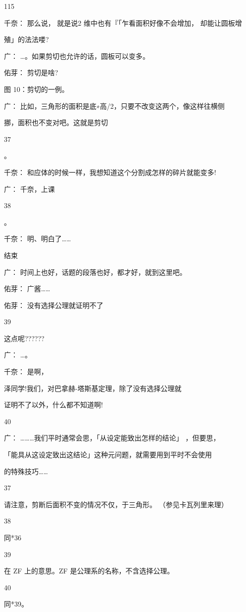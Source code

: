 115\par
千奈： 那么说， 就是说2 维中也有『「乍看面积好像不会增加， 却能让圆板增\par
殖」的法法喽?\par
广： …。如果剪切也允许的话，圆板可以变多。\par
佑芽： 剪切是啥?\par
图 10：剪切的一例。\par
广： 比如，三角形的面积是底∗高/2，只要不改变这两个，像这样往横侧\par
挪，面积也不变对吧。这就是剪切\par
37\par
。\par
千奈： 和应体的时候一样，我想知道这个分割成怎样的碎片就能变多!\par
广： 千奈，上课\par
38\par
。\par
千奈： 明、明白了……\par
结束\par
广： 时间上也好，话题的段落也好，都才好，就到这里吧。\par
佑芽： 广酱……\par
佑芽： 没有选择公理就证明不了\par
39\par
这点呢??????\par
广： …。\par
千奈： 是啊，\par
泽同学!我们，对巴拿赫-塔斯基定理，除了没有选择公理就\par
证明不了以外，什么都不知道啊!\par
40\par
广： ………我们平时通常会思，「从设定能致出怎样的结论」 ，但要思，\par
「能具从这设定致出这结论」这种元问题，就需要用到平时不会使用\par
的特殊技巧……\par
37\par
请注意，剪断后面积不变的情况不仅，于三角形。 （参见卡瓦列里来理）\par
38\par
同*36\par
39\par
在 ZF 上的意思。ZF 是公理系的名称，不含选择公理。\par
40\par
同*39。\par

